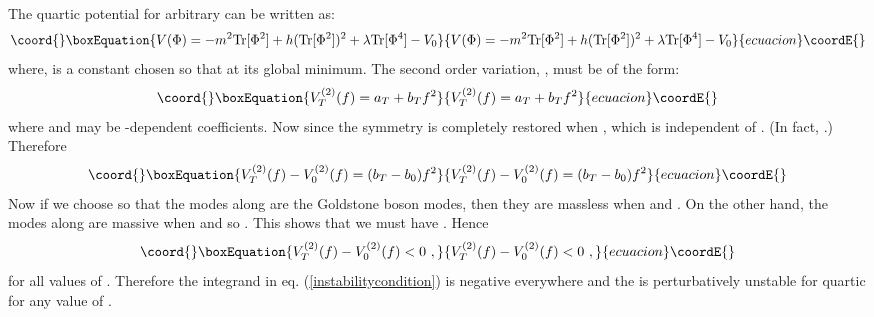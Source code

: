 \documentclass[a4paper,prd,nofootinbib,twocolumn,showpacs]{revtex4}
\begin{document}
The quartic potential for arbitrary \coordHE{} can be written as:
\begin{equation}\coord{}\boxEquation{
V(\Phi ) = - m^2 {\rm Tr}[ \Phi ^2 ]+ h ( {\rm Tr}[\Phi ^2  ])^2 +
  \lambda {\rm Tr}[\Phi ^4]  - V_0 
\label{quarticV}
}{
V(\Phi ) = - m^2 {\rm Tr}[ \Phi ^2 ]+ h ( {\rm Tr}[\Phi ^2  ])^2 +
  \lambda {\rm Tr}[\Phi ^4]  - V_0 
}{ecuacion}\coordE{}\end{equation}
where, \coordHE{} is a constant chosen so that \coordHE{} at its
global minimum. The second order variation, \coordHE{}, 
must be of the form:
\begin{equation}\coord{}\boxEquation{
V^{(2)}_T(f) = a_T + b_T f^2
\label{V2form}
}{
V^{(2)}_T(f) = a_T + b_T f^2
}{ecuacion}\coordE{}\end{equation}
where \coordHE{} and \coordHE{} may be \coordHE{}-dependent coefficients.
Now since the symmetry is completely restored when
\coordHE{}, \coordHE{} which is independent of \coordHE{}. (In fact,
\coordHE{}.) Therefore 
\begin{equation}\coord{}\boxEquation{
V^{(2)}_T(f) - V^{(2)}_0 (f) =  (b_T - b_0) f^2
\label{V2-V2form}
}{
V^{(2)}_T(f) - V^{(2)}_0 (f) =  (b_T - b_0) f^2
}{ecuacion}\coordE{}\end{equation}
Now if we choose \coordHE{} so that the modes along \coordHE{} are the 
Goldstone boson modes, then they are massless when \coordHE{}
and \coordHE{}. On the other hand, the modes
along \coordHE{} are massive when \coordHE{} and so
\coordHE{}. This shows that we must
have \coordHE{}. Hence
\begin{equation}\coord{}\boxEquation{
V^{(2)}_T(f) - V^{(2)}_0 (f) < 0 \ ,
\label{V2-V2lessthan0}
}{
V^{(2)}_T(f) - V^{(2)}_0 (f) < 0 \ ,
}{ecuacion}\coordE{}\end{equation}
for all values of \coordHE{}. Therefore the integrand in 
eq. (\ref{instabilitycondition}) is negative everywhere
and the \coordHE{} is perturbatively unstable for quartic
\coordHE{} for any value of \coordHE{}.
\end{document}
